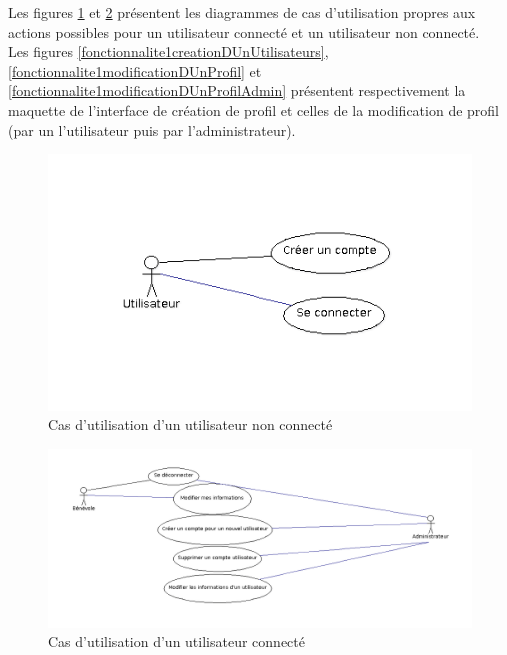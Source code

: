 Les figures \ref{utilisateurNonConnecte} et \ref{utilisateurConnecte} présentent les diagrammes de cas d'utilisation propres aux actions possibles pour un utilisateur connecté et un utilisateur non connecté.\\
Les figures \ref{fonctionnalite1creationDUnUtilisateurs}, \ref{fonctionnalite1modificationDUnProfil}  et \ref{fonctionnalite1modificationDUnProfilAdmin} présentent respectivement la maquette de l'interface de création de profil et celles de la modification de profil (par un l'utilisateur puis par l'administrateur). \\
\begin{figure}[H]
	\centering
	\includegraphics[scale=0.4]{images/casDUtilisation/fonctionnalite1UtilisateurNonConnecte.png}
	 \caption{Cas d'utilisation  d'un utilisateur non connecté}
	 \label{utilisateurNonConnecte}
\end{figure}

\begin{figure}[H]
	\centering
	\includegraphics[scale=0.4]{images/casDUtilisation/fonctionnalite1UtilisateurConnecte.png}
	 \caption{Cas d'utilisation  d'un utilisateur connecté}
	 \label{utilisateurConnecte}

\end{figure}



